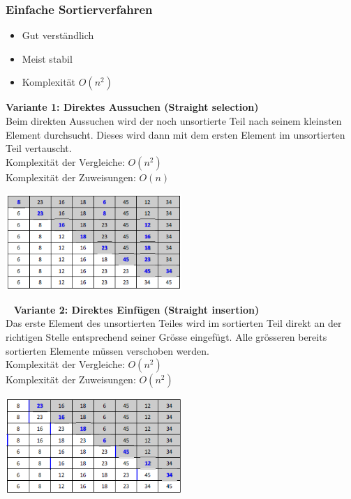 \subsubsection{Einfache Sortierverfahren}
\begin{itemize}
    \item Gut verständlich
    \item Meist stabil
    \item Komplexität $O(n^2)$
\end{itemize}
\textbf{Variante 1: Direktes Aussuchen (Straight selection)}\\
Beim direkten Aussuchen wird der noch unsortierte Teil nach seinem kleinsten Element durchsucht. Dieses wird dann mit dem ersten Element im unsortierten Teil vertauscht.\\
Komplexität der Vergleiche: $O(n^2)$\\
Komplexität der Zuweisungen: $O(n)$\\
\begin{multicols}{2}

\includegraphics[width=0.5\textwidth]{images/Algorithmen/DirektesAussuchen.png}
\end{multicols}
\ \newline
\textbf{Variante 2: Direktes Einfügen (Straight insertion)}\\
Das erste Element des unsortierten Teiles wird im sortierten Teil direkt an der richtigen Stelle entsprechend seiner Grösse eingefügt. Alle grösseren bereits sortierten Elemente müssen verschoben werden.\\
Komplexität der Vergleiche: $O(n^2)$\\
Komplexität der Zuweisungen: $O(n^2)$\\
\begin{multicols}{2}

\includegraphics[width=0.5\textwidth]{images/Algorithmen/DirektesEinfuegen.png}
\end{multicols}
